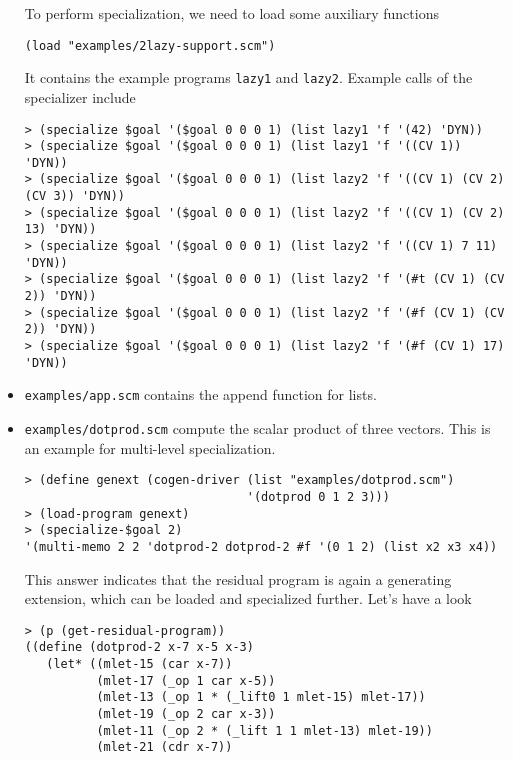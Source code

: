\documentclass[11pt]{article}
\begin{document}
\begin{itemize}
  To perform specialization, we need to load some auxiliary functions
\begin{small}
\begin{verbatim}
(load "examples/2lazy-support.scm")
\end{verbatim}
\end{small}
It contains the example programs \texttt{lazy1} and \texttt{lazy2}.
  Example calls of the specializer include
\begin{small}
\begin{verbatim}
> (specialize $goal '($goal 0 0 0 1) (list lazy1 'f '(42) 'DYN))
> (specialize $goal '($goal 0 0 0 1) (list lazy1 'f '((CV 1)) 'DYN))
> (specialize $goal '($goal 0 0 0 1) (list lazy2 'f '((CV 1) (CV 2) (CV 3)) 'DYN))
> (specialize $goal '($goal 0 0 0 1) (list lazy2 'f '((CV 1) (CV 2) 13) 'DYN))
> (specialize $goal '($goal 0 0 0 1) (list lazy2 'f '((CV 1) 7 11) 'DYN))
> (specialize $goal '($goal 0 0 0 1) (list lazy2 'f '(#t (CV 1) (CV 2)) 'DYN))
> (specialize $goal '($goal 0 0 0 1) (list lazy2 'f '(#f (CV 1) (CV 2)) 'DYN))
> (specialize $goal '($goal 0 0 0 1) (list lazy2 'f '(#f (CV 1) 17) 'DYN))
\end{verbatim}
\end{small}
\item \texttt{examples/app.scm} contains the append function for
  lists.  
\item \texttt{examples/dotprod.scm} compute the scalar product of
  three vectors. This is an example for multi-level
  specialization.
  \begin{small}
\begin{verbatim}
> (define genext (cogen-driver (list "examples/dotprod.scm")
                               '(dotprod 0 1 2 3)))
> (load-program genext)
> (specialize-$goal 2)
'(multi-memo 2 2 'dotprod-2 dotprod-2 #f '(0 1 2) (list x2 x3 x4))
\end{verbatim}
  \end{small}
  This answer indicates that the residual program is again a
  generating extension, which can be loaded and specialized
  further. Let's have a look
  \begin{small}
\begin{verbatim}
> (p (get-residual-program))
((define (dotprod-2 x-7 x-5 x-3)
   (let* ((mlet-15 (car x-7))
          (mlet-17 (_op 1 car x-5))
          (mlet-13 (_op 1 * (_lift0 1 mlet-15) mlet-17))
          (mlet-19 (_op 2 car x-3))
          (mlet-11 (_op 2 * (_lift 1 1 mlet-13) mlet-19))
          (mlet-21 (cdr x-7))

\end{verbatim}
\end{small}
\end{itemize}
\end{document}

